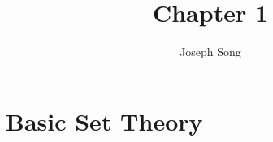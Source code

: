 \documentclass{article}
\title{Chapter 1}
\author{Joseph Song}
\date{}
\begin{document}
\maketitle

\section{Basic Set Theory}
\end{document}
